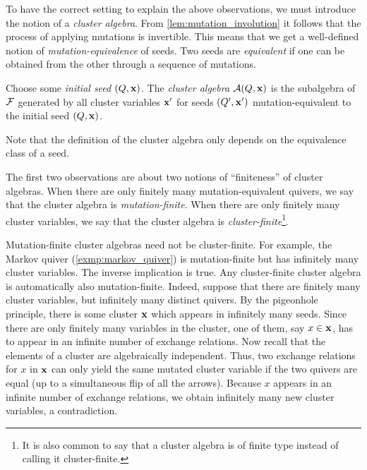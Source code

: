 To have the correct setting to explain the above observations, we must introduce the
notion of a \emph{cluster algebra}. From
\cref{lem:mutation_involution} it follows that the process of applying mutations is
invertible. This means that we get a well-defined notion of
\emph{mutation-equivalence} of seeds. Two seeds are
\emph{equivalent} if one can be obtained from the other through
a sequence of mutations.
\begin{definition}

	Choose some \emph{initial seed} $(Q, \mathbf{x})$. The \emph{cluster
		algebra} $\mathcal{A} (Q, \mathbf{x})$ is the subalgebra of $\mathcal{F}$
	generated by all cluster variables $\mathbf{x}'$ for seeds $(Q', \mathbf{x}')$ mutation-equivalent to
	the initial seed $(Q, \mathbf{x})$.
\end{definition}
\begin{remark}

	Note that the definition of the cluster algebra only depends on the equivalence class
	of a seed.
\end{remark}

The first two observations are about two notions of ``finiteness'' of cluster algebras.
When there are only finitely many mutation-equivalent quivers, we say that the cluster
algebra is \emph{mutation-finite}. When there are only finitely
many cluster variables, we say that the cluster algebra is
\emph{cluster-finite}\footnote{It is also common to say that a
	cluster algebra is of finite type instead of calling it cluster-finite.}.

Mutation-finite cluster algebras need not be cluster-finite. For example, the Markov
quiver (\cref{exmp:markov_quiver}) is mutation-finite but has infinitely many cluster
variables. The inverse implication is true. Any cluster-finite cluster algebra is
automatically also mutation-finite. Indeed, suppose that there are finitely many
cluster variables, but infinitely many distinct quivers. By the pigeonhole principle,
there is some cluster $\mathbf{x}$ which appears in infinitely many seeds. Since there are
only finitely many variables in the cluster, one of them, say $x \in \mathbf{x}$, has to
appear in an infinite number of exchange relations. Now recall that the elements of a
cluster are algebraically independent. Thus, two exchange relations for $x$ in $\mathbf{x}$
can only yield the same mutated cluster variable if the two quivers are equal (up to a
simultaneous flip of all the arrows). Because $x$ appears in an infinite number of
exchange relations, we obtain infinitely many new cluster variables, a contradiction.

